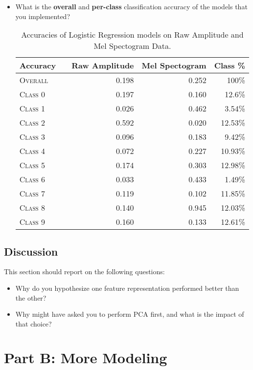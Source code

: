 \documentclass[11pt]{article}
\begin{document}
\begin{itemize}
\item  What is the \textbf{overall} and \textbf{per-class} classification accuracy of the models that you implemented?
\begin{table}[ht]
\centering
\begin{tabular}{llrrr}
    \toprule
    Accuracy &  & Raw Amplitude & Mel Spectogram & Class \% \\
    \midrule
    \textsc{Overall} & & 0.198 & 0.252 & 100\% \\
    \textsc{Class 0} & & 0.197 & 0.160 & 12.6\% \\
    \textsc{Class 1} & & 0.026 & 0.462 & 3.54\% \\
    \textsc{Class 2} & & 0.592 & 0.020 & 12.53\% \\
    \textsc{Class 3} & & 0.096 & 0.183 & 9.42\% \\
    \textsc{Class 4} & & 0.072 & 0.227 & 10.93\% \\
    \textsc{Class 5} & & 0.174 & 0.303 & 12.98\% \\
    \textsc{Class 6} & & 0.033 & 0.433 & 1.49\% \\
    \textsc{Class 7} & & 0.119 & 0.102 & 11.85\% \\
    \textsc{Class 8} & & 0.140 & 0.945 & 12.03\% \\
    \textsc{Class 9} & & 0.160 & 0.133 & 12.61\% \\
    \bottomrule
\end{tabular}
\caption{\label{tab:rf_results} Accuracies of Logistic Regression models on Raw Amplitude and Mel Spectogram Data.}
\end{table}
\end{itemize}

\subsection{Discussion}

This section should report on the following questions: 

\begin{itemize}
  \item Why do you hypothesize one feature representation performed better than the other?  
  \item Why might have asked you to perform PCA first, and what is the impact of that choice?
  \end{itemize}

\section{Part B: More Modeling}
\end{document}
